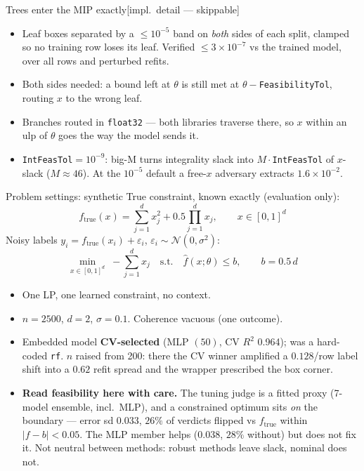 \documentclass{beamer}
\newcommand{\implnote}{\hfill{\normalfont\scriptsize\color{gray}[impl.\ detail --- skippable]}}
\begin{document}
\begin{frame}{Trees enter the MIP exactly\implnote}
  \begin{itemize}
    \item Leaf boxes separated by a $\le10^{-5}$ band on \emph{both} sides of each
      split, clamped so no training row loses its leaf. Verified
      $\le3\times10^{-7}$ vs the trained model, over all rows and perturbed refits.
    \item Both sides needed: a bound left at $\theta$ is still met at
      $\theta-$\texttt{FeasibilityTol}, routing $x$ to the wrong leaf.
    \item Branches routed in \texttt{float32} --- both libraries traverse there,
      so $x$ within an ulp of $\theta$ goes the way the model sends it.
    \item \texttt{IntFeasTol}$=10^{-9}$: big-M turns integrality slack into
      $M\!\cdot\!$\texttt{IntFeasTol} of $x$-slack ($M\!\approx\!46$). At the
      $10^{-5}$ default a free-$x$ adversary extracts $1.6\times10^{-2}$.
  \end{itemize}
\end{frame}

\begin{frame}{Problem settings: synthetic}
  True constraint, known exactly (evaluation only):
  \[
    f_{\text{true}}(x) = \sum_{j=1}^d x_j^2 + 0.5\prod_{j=1}^d x_j, \qquad x\in[0,1]^d
  \]
  Noisy labels $y_i = f_{\text{true}}(x_i)+\varepsilon_i$,
  $\varepsilon_i\sim\mathcal N(0,\sigma^2)$:
  \[
    \min_{x\in[0,1]^d} \; -\sum_{j=1}^d x_j \quad\text{s.t.}\quad \hat f(x;\theta)\le b,
    \qquad b=0.5\,d
  \]
  \begin{itemize}
    \item One LP, one learned constraint, no context.
    \item $n=2500$, $d=2$, $\sigma=0.1$. Coherence vacuous (one outcome).
    \item Embedded model \textbf{CV-selected} (MLP $(50)$, CV $R^2$ 0.964); was a
      hard-coded \texttt{rf}. $n$ raised from 200: there the CV winner amplified a
      $0.128$/row label shift into a $0.62$ refit spread and the wrapper
      prescribed the box corner.
    \item \textbf{Read feasibility here with care.} The tuning judge is a fitted
      proxy (7-model ensemble, incl.\ MLP), and a constrained optimum sits
      \emph{on} the boundary --- error sd $0.033$, $26\%$ of verdicts flipped vs
      $f_{\text{true}}$ within $|f-b|<0.05$. The MLP member helps ($0.038$, $28\%$
      without) but does not fix it. Not neutral between methods: robust methods
      leave slack, nominal does not.
  \end{itemize}
\end{frame}
\end{document}
